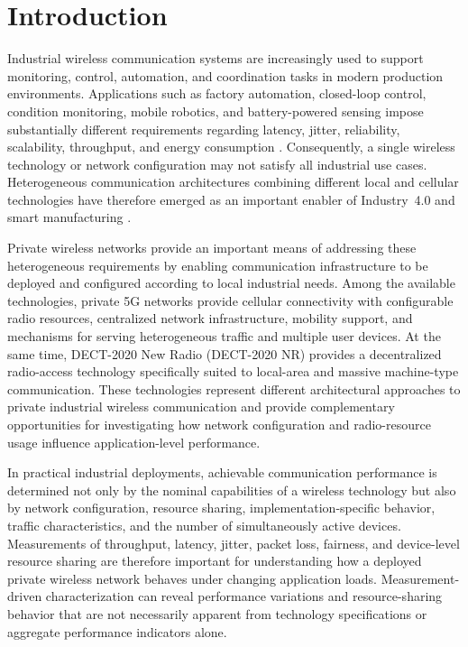 \documentclass[12pt,a4paper]{article}
\begin{document}
\section{Introduction}
\label{sec:introduction}

Industrial wireless communication systems are increasingly used to support
monitoring, control, automation, and coordination tasks in modern production
environments. Applications such as factory automation, closed-loop control,
condition monitoring, mobile robotics, and battery-powered sensing impose
substantially different requirements regarding latency, jitter, reliability,
scalability, throughput, and energy consumption
\cite{willigWirelessTechnologyIndustrial2005,
vitturiIndustrialWirelessNetworks2013,
wollschlaegerFutureIndustrialCommunication2017a}.
Consequently, a single wireless technology or network configuration may not
satisfy all industrial use cases. Heterogeneous communication architectures
combining different local and cellular technologies have therefore emerged as
an important enabler of Industry~4.0 and smart manufacturing
\cite{alizaiHeterogeneousCommunicationNetworks2023a,
karrenbauerFutureIndustrialNetworking2019a,
aschenbrennerFlexiCell5GLocationbased2022a}.

Private wireless networks provide an important means of addressing these
heterogeneous requirements by enabling communication infrastructure to be
deployed and configured according to local industrial needs. Among the
available technologies, private 5G networks provide cellular connectivity with
configurable radio resources, centralized network infrastructure, mobility
support, and mechanisms for serving heterogeneous traffic and multiple user
devices. At the same time, DECT-2020 New Radio (DECT-2020 NR) provides a
decentralized radio-access technology specifically suited to local-area and
massive machine-type communication. These technologies represent different
architectural approaches to private industrial wireless communication and
provide complementary opportunities for investigating how network
configuration and radio-resource usage influence application-level
performance.

In practical industrial deployments, achievable communication performance is
determined not only by the nominal capabilities of a wireless technology but
also by network configuration, resource sharing, implementation-specific
behavior, traffic characteristics, and the number of simultaneously active
devices. Measurements of throughput, latency, jitter, packet loss, fairness,
and device-level resource sharing are therefore important for understanding
how a deployed private wireless network behaves under changing application
loads. Measurement-driven characterization can reveal performance variations
and resource-sharing behavior that are not necessarily apparent from
technology specifications or aggregate performance indicators alone.
\end{document}
